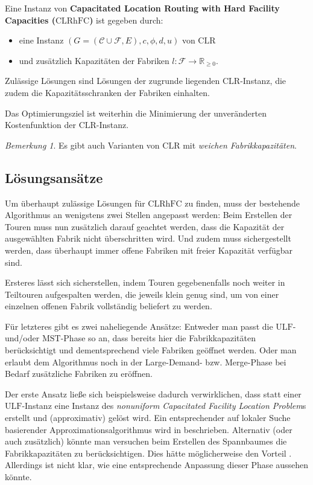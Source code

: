 \documentclass[a4paper,ngerman,12pt,bibtotoc]{scrartcl}
\theoremstyle{definition}
\theoremstyle{plain}
\theoremstyle{remark}
\newtheorem{bem}[defn]{Bemerkung}
\newcommand{\IR}{\mathbb{R}}
\newcommand{\ClientSet}{\mathscr{C}}
\newcommand{\FacilitySet}{\mathscr{F}}
\newcommand{\CLR}{\mathrm{CLR}}
\newcommand{\CLRHFC}{\mathrm{CLRhFC}}
\newcommand{\MST}{\mathrm{MST}}
\newcommand{\ULF}{\mathrm{ULF}}
\begin{document}
Eine Instanz von \textbf{Capacitated Location Routing with Hard Facility Capacities ($\CLRHFC$)} ist gegeben durch:
\begin{itemize}
	\item eine Instanz $(G=(\ClientSet\cup\FacilitySet,E), c,\phi,d,u)$ von $\CLR$
	\item und zusätzlich Kapazitäten der Fabriken $l: \FacilitySet \to \IR_{\geq 0}$.
\end{itemize}
Zulässige Lösungen sind Lösungen der zugrunde liegenden $\CLR$-Instanz, die zudem die Kapazitätsschranken der Fabriken einhalten.

Das Optimierungsziel ist weiterhin die Minimierung der unveränderten Kostenfunktion der $\CLR$-Instanz.

\begin{bem}
Es gibt auch Varianten von $\CLR$ mit \emph{weichen Fabrikkapazitäten}. 

\end{bem}

	\subsection{Lösungsansätze}
	
	Um überhaupt zulässige Lösungen für $\CLRHFC$ zu finden, muss der bestehende Algorithmus an wenigstens zwei Stellen angepasst werden: Beim Erstellen der Touren muss nun zusätzlich darauf geachtet werden, dass die Kapazität der ausgewählten Fabrik nicht überschritten wird. Und zudem muss sichergestellt werden, dass überhaupt immer offene Fabriken mit freier Kapazität verfügbar sind.
	
	Ersteres lässt sich sicherstellen, indem Touren gegebenenfalls noch weiter in Teiltouren aufgespalten werden, die jeweils klein genug sind, um von einer einzelnen offenen Fabrik vollständig beliefert zu werden.
	
	Für letzteres gibt es zwei naheliegende Ansätze: Entweder man passt die $\ULF$- und/oder $\MST$-Phase so an, dass bereits hier die Fabrikkapazitäten berücksichtigt und dementsprechend viele Fabriken geöffnet werden. Oder man erlaubt dem Algorithmus noch in der Large-Demand- bzw. Merge-Phase bei Bedarf zusätzliche Fabriken zu eröffnen. 
	
	Der erste Ansatz ließe sich beispielsweise dadurch verwirklichen, dass statt einer $\ULF$-Instanz eine Instanz des \emph{nonuniform Capacitated Facility Location Problem}s erstellt und (approximativ) gelöst wird. Ein entsprechender auf lokaler Suche basierender Approximationsalgorithmus wird in \cite{Pal01facilitylocation} beschrieben. Alternativ (oder auch zusätzlich) könnte man versuchen beim Erstellen des Spannbaumes die Fabrikkapazitäten zu berücksichtigen. Dies hätte möglicherweise den Vorteil . Allerdings ist nicht klar, wie eine entsprechende Anpassung dieser Phase aussehen könnte.
	
\end{document}
